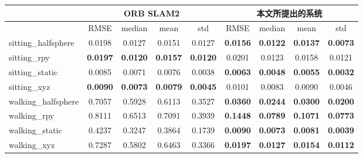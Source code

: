 \begin{table}[!htbp]
    \label{tab:ATE}
    \centering
    \footnotesize%
    \setlength{\tabcolsep}{8pt}%
    \renewcommand{\arraystretch}{1.3}%
    \begin{tabular}{l|cccc|cccc}
        \hline
        & \multicolumn{4}{c|}{ORB SLAM2}                                         & \multicolumn{4}{c}{本文所提出的系统}                                        \\ \hline
        & RMSE            & median          & mean            & std             & RMSE            & median          & mean            & std             \\ \hline
        sitting\_halfsphere & 0.0198          & 0.0127          & 0.0151          & 0.0127          & \textbf{0.0156} & \textbf{0.0122} & \textbf{0.0137} & \textbf{0.0073} \\ \hline 
        sitting\_rpy        & \textbf{0.0197} & \textbf{0.0120} & \textbf{0.0157} & \textbf{0.0120} & 0.0201          & 0.0123          & 0.0158          & 0.0121          \\ \hline
        sitting\_static     & 0.0085          & 0.0071          & 0.0076          & 0.0038          & \textbf{0.0063} & \textbf{0.0048} & \textbf{0.0055} & \textbf{0.0032} \\ \hline
        sitting\_xyz        & \textbf{0.0090} & \textbf{0.0073} & \textbf{0.0079} & \textbf{0.0045} & 0.0101          & 0.0083          & 0.0090          & 0.0046          \\ \hline
        walking\_halfsphere & 0.7057          & 0.5928          & 0.6113          & 0.3527          & \textbf{0.0360} & \textbf{0.0244} & \textbf{0.0300} & \textbf{0.0200} \\ \hline
        walking\_rpy        & 0.8111          & 0.6513          & 0.7091          & 0.3939          & \textbf{0.1448} & \textbf{0.0789} & \textbf{0.1071} & \textbf{0.0773} \\ \hline
        walking\_static     & 0.4237          & 0.3247          & 0.3864          & 0.1739          & \textbf{0.0090} & \textbf{0.0073} & \textbf{0.0081} & \textbf{0.0039} \\ \hline
        walking\_xyz        & 0.7287          & 0.5802          & 0.6463          & 0.3366          & \textbf{0.0197} & \textbf{0.0127} & \textbf{0.0154} & \textbf{0.0112} \\ \hline
        \hline
    \end{tabular}
\end{table}

